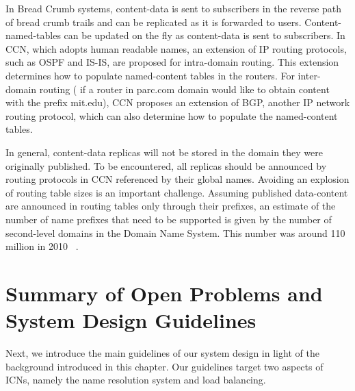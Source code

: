 In Bread Crumb systems, content-data is sent to subscribers in the reverse path of bread crumb trails and  
 can be replicated as it is forwarded to users. Content-named-tables can be updated on the fly as content-data 
is sent to subscribers. In CCN, which adopts human readable names, an extension of IP routing protocols, such as OSPF and IS-IS, are proposed for intra-domain routing.  This extension determines how to populate named-content tables in the routers. For inter-domain routing ( if a router in parc.com domain would like to obtain content 
with the prefix mit.edu), CCN proposes an extension of BGP, another IP network routing protocol, which can also determine how to populate the
named-content tables. 


In general, content-data replicas will not be stored in the domain they were originally published. 
To be encountered, all replicas should be announced by routing protocols in CCN referenced by their global names.  
Avoiding an  explosion of routing table sizes is an important challenge. Assuming published data-content are announced in routing tables only  through their prefixes, an estimate of the number of name prefixes that need to be supported is given by the number of second-level domains 
in the Domain Name System. This number was around 110 million in 2010 ~\cite{netinf}. 





\section{Summary of Open Problems and System Design Guidelines}

\label{sec:summaryopendesign}


Next, we introduce the main guidelines of our system design in light of the background introduced in this chapter.
  Our guidelines target two aspects of ICNs, namely the name resolution system and load balancing.


